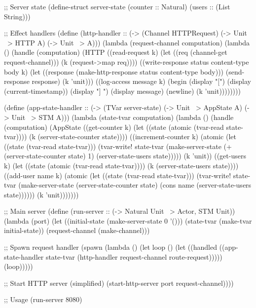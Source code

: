 \begin{example}
\begin{lambdustcode}
;; Server state
(define-struct server-state
  (counter :: Natural)
  (users :: (List String)))

;; Effect handlers
(define (http-handler :: (-> (Channel HTTPRequest) 
                            (-> Unit ~> {HTTP} A) 
                            (-> Unit ~> {} A)))
  (lambda (request-channel computation)
    (lambda ()
      (handle (computation)
        (HTTP
          ((read-request k)
           (let ((req (channel-get request-channel)))
             (k (request->map req))))
          ((write-response status content-type body k)
           (let ((response (make-http-response status content-type body)))
             (send-response response)
             (k 'unit)))
          ((log-access message k)
           (begin
             (display "[") (display (current-timestamp)) (display "] ")
             (display message) (newline)
             (k 'unit))))))))

(define (app-state-handler :: (-> (TVar server-state)
                                 (-> Unit ~> {AppState} A)
                                 (-> Unit ~> {STM} A)))
  (lambda (state-tvar computation)
    (lambda ()
      (handle (computation)
        (AppState
          ((get-counter k)
           (let ((state (atomic (tvar-read state-tvar))))
             (k (server-state-counter state))))
          ((increment-counter k)
           (atomic 
             (let ((state (tvar-read state-tvar)))
               (tvar-write! state-tvar 
                 (make-server-state (+ (server-state-counter state) 1)
                                   (server-state-users state)))))
           (k 'unit))
          ((get-users k)
           (let ((state (atomic (tvar-read state-tvar))))
             (k (server-state-users state))))
          ((add-user name k)
           (atomic
             (let ((state (tvar-read state-tvar)))
               (tvar-write! state-tvar
                 (make-server-state (server-state-counter state)
                                   (cons name (server-state-users state))))))
           (k 'unit)))))))

;; Main server
(define (run-server :: (-> Natural Unit ~> {Actor, STM} Unit))
  (lambda (port)
    (let ((initial-state (make-server-state 0 '()))
          (state-tvar (make-tvar initial-state))
          (request-channel (make-channel)))
      
      ;; Spawn request handler  
      (spawn
        (lambda ()
          (let loop ()
            (let ((handled ((app-state-handler state-tvar
                              (http-handler request-channel route-request)))))
              (loop)))))
      
      ;; Start HTTP server (simplified)
      (start-http-server port request-channel))))

;; Usage
(run-server 8080)
\end{lambdustcode}
\end{example}

